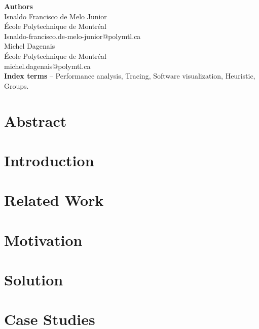 \label{sec:Theme2}
\textbf{Authors}\\
Isnaldo Francisco de Melo Junior\\
École Polytechnique de Montréal\\
Isnaldo-francisco.de-melo-junior@polymtl.ca\\
 
Michel Dagenais\\
École Polytechnique de Montréal\\
michel.dagenais@polymtl.ca\\
 
\textbf{Index terms} – Performance analysis, Tracing, Software visualization, Heuristic, Groups.\\

\section{Abstract}
\label{sec:abstract}



\section{Introduction}
\label{sec:introduction}

 
\section{Related Work}
\label{sec:related-work}



\section{Motivation}
\label{sec:motivation}


\section{Solution}
\label{sec:solution}


\label{sec:methodology}



\section{Case Studies}
\label{sec:usecases}


